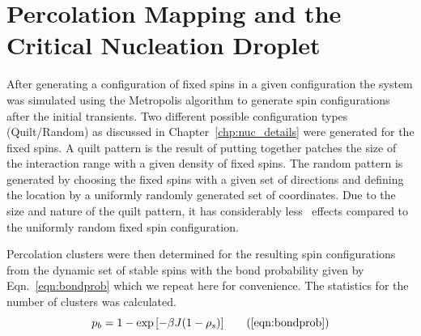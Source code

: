 \section{Percolation Mapping and the Critical Nucleation Droplet}
\label{heterpercolation}

After generating a configuration of fixed spins in a given configuration the system was simulated using the Metropolis algorithm to generate spin configurations after the initial transients. Two different possible configuration types (Quilt/Random) as discussed in Chapter~\ref{chp:nuc_details} were generated for the fixed spins. A quilt pattern is the result of putting together patches the size of the interaction range with a given density of fixed spins. The random pattern is generated by choosing the fixed spins with a given set of directions and defining the location by a uniformly randomly generated set of coordinates. Due to the size and nature  of the quilt pattern, it has considerably less \het\ effects compared to the uniformly random fixed spin configuration.

Percolation clusters were then determined for the resulting spin configurations from the dynamic set of stable spins with the bond probability given by Eqn.~\eqref{eqn:bondprob} which we repeat here for convenience. The statistics for the number of clusters was calculated. 
\begin{equation}
	p_b = 1-\exp{[-\beta J(1-\rho_s)]}
	\tag{\ref{eqn:bondprob}}
\end{equation}%

